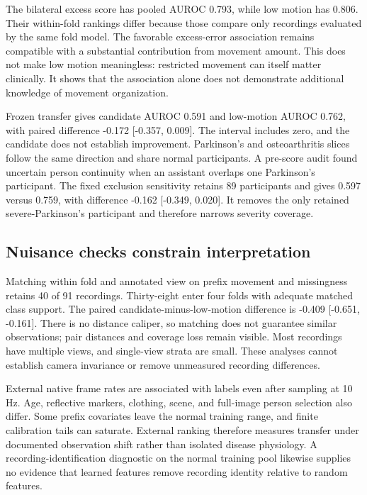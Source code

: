 \documentclass[letterpaper]{article}
\begin{document}
The bilateral excess score has pooled AUROC 0.793, while low motion has 0.806. Their within-fold rankings differ because those compare only recordings evaluated by the same fold model. The favorable excess-error association remains compatible with a substantial contribution from movement amount. This does not make low motion meaningless: restricted movement can itself matter clinically. It shows that the association alone does not demonstrate additional knowledge of movement organization.

Frozen transfer gives candidate AUROC 0.591 and low-motion AUROC 0.762, with paired difference -0.172 [-0.357, 0.009]. The interval includes zero, and the candidate does not establish improvement. Parkinson's and osteoarthritis slices follow the same direction and share normal participants. A pre-score audit found uncertain person continuity when an assistant overlaps one Parkinson's participant. The fixed exclusion sensitivity retains 89 participants and gives 0.597 versus 0.759, with difference -0.162 [-0.349, 0.020]. It removes the only retained severe-Parkinson's participant and therefore narrows severity coverage.

\subsection{Nuisance checks constrain interpretation}

Matching within fold and annotated view on prefix movement and missingness retains 40 of 91 recordings. Thirty-eight enter four folds with adequate matched class support. The paired candidate-minus-low-motion difference is -0.409 [-0.651, -0.161]. There is no distance caliper, so matching does not guarantee similar observations; pair distances and coverage loss remain visible. Most recordings have multiple views, and single-view strata are small. These analyses cannot establish camera invariance or remove unmeasured recording differences.

External native frame rates are associated with labels even after sampling at 10 Hz. Age, reflective markers, clothing, scene, and full-image person selection also differ. Some prefix covariates leave the normal training range, and finite calibration tails can saturate. External ranking therefore measures transfer under documented observation shift rather than isolated disease physiology. A recording-identification diagnostic on the normal training pool likewise supplies no evidence that learned features remove recording identity relative to random features.
\end{document}
